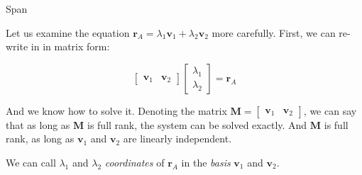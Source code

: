 \documentclass{beamer}
\begin{document}
\begin{frame}{Span}
	\begin{flushleft}
		
	Let us examine the equation $\mathbf r_A = \lambda_1 \mathbf v_1 + \lambda_2 \mathbf v_2$ more carefully. First, we can re-write in in matrix form:
	
	\begin{equation}
		\begin{bmatrix}
			\mathbf v_1 & \mathbf v_2
		\end{bmatrix}
		\begin{bmatrix}
			\lambda_1 \\ \lambda_2
		\end{bmatrix}
		=
		\mathbf r_A
	\end{equation}

\bigskip	

	And we know how to solve it. Denoting the matrix $\mathbf M = \begin{bmatrix}
		\mathbf v_1 & \mathbf v_2
	\end{bmatrix}$, we can say that as long as $\mathbf M$ is full rank, the system can be solved exactly. And $\mathbf M$ is full rank, as long as $\mathbf v_1$ and $\mathbf v_2$ are linearly independent.

\bigskip	

	We can call $\lambda_1$ and $\lambda_2$ \emph{coordinates} of $\mathbf r_A$ in the \emph{basis} $\mathbf v_1$ and $\mathbf v_2$.

		
	\end{flushleft}
\end{frame}
\end{document}
